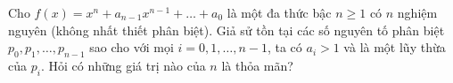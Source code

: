 \ifshowproblem
\begin{problem}[\gls{BW 2015}/P18]\label{example:BW-2015-P18}
    Cho \( f(x) = x^n + a_{n-1}x^{n-1} + \ldots + a_0 \) là một đa thức bậc \( n \ge 1 \) có \( n \) nghiệm nguyên (không nhất thiết phân biệt).  
    Giả sử tồn tại các số nguyên tố phân biệt \( p_0, p_1, \ldots, p_{n-1} \) sao cho với mọi \( i = 0, 1, \ldots, n-1 \),
    ta có \( a_i > 1 \) và là một lũy thừa của \( p_i \).
    Hỏi có những giá trị nào của \( n \) là thỏa mãn?
\end{problem}
\fi

\footnotemark
{}
\fi